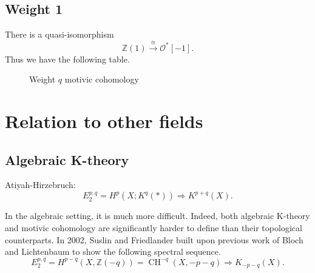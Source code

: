 \documentclass[leqno, openany]{memoir}
\theoremstyle{definition}
\theoremstyle{remark}
\theoremstyle{plain}
\theoremstyle{definition}
\theoremstyle{remark}
\newcommand{\Z}{\mathbb{Z}}
\newcommand{\mc}[1]{\mathcal{#1}}
\DeclareMathOperator{\Pic}{Pic}
\DeclareMathOperator{\CH}{CH}
\begin{document}
\subsection{Weight 1} 
There is a quasi-isomorphism 
\[
\Z(1)\xrightarrow{\cong}\mc{O}^*[-1].
\]
Thus we have the following table.

\begin{figure}[htpb]
\begin{center}
\end{center}
\caption{Weight $q$ motivic cohomology}%
\label{fig:weight-motivic-cohomology}
\end{figure}


 

\section{Relation to other fields} 
\subsection{Algebraic K-theory}
Atiyah-Hirzebruch: 
\[E_2^{p, q}=H^p(X; K^q(*))\Rightarrow K^{p+q}(X).\]

In the algebraic setting, it is much more difficult.  Indeed, both algebraic K-theory and motivic cohomology are significantly harder to define than their topological counterparts.  In 2002, Suslin and Friedlander built upon previous work of Bloch and Lichtenbaum to show the following spectral sequence. 
\[
E_2^{p,q}=H^{p-q}(X, \Z(-q))=\CH^{-q}(X, -p-q)\Rightarrow K_{-p-q}(X).
\]
\end{document}
